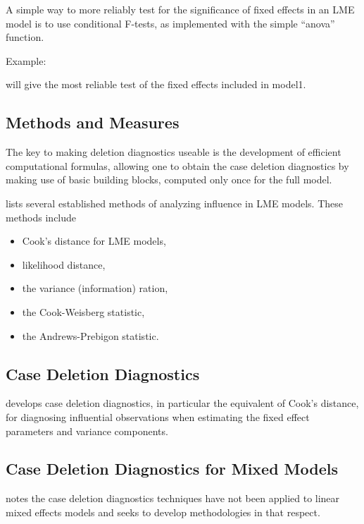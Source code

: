 \documentclass[12pt, a4paper]{report}
\theoremstyle{plain}
\theoremstyle{definition}
\theoremstyle{remark}
\begin{document}
A simple way to more reliably test for the significance of fixed effects in an LME model is to use 
conditional F-tests, as implemented with the simple “anova” function. 

Example: 

will give the most reliable test of the fixed effects included in model1. 


\subsection{Methods and Measures}
The key to making deletion diagnostics useable is the development of efficient computational formulas, allowing one to obtain the  case deletion diagnostics by making use of basic building blocks, computed only once for the full model.


\citet{Zewotir} lists several established methods of analyzing influence in LME models. These methods include \begin{itemize}
	\item Cook's distance for LME models,
	\item {} likelihood distance,
	\item the variance (information) ration,
	\item the  Cook-Weisberg statistic,
	\item the  Andrews-Prebigon statistic.
\end{itemize}




\subsection{Case Deletion Diagnostics} %

\citet{CPJ} develops  case deletion diagnostics, in particular the equivalent of  Cook's distance, for diagnosing influential observations when estimating the fixed effect parameters and variance components.



\subsection{Case Deletion Diagnostics for Mixed Models}

\citet{Christiansen} notes the case deletion diagnostics techniques have not been applied to linear mixed effects models and seeks to develop methodologies in that respect.
\end{document}
